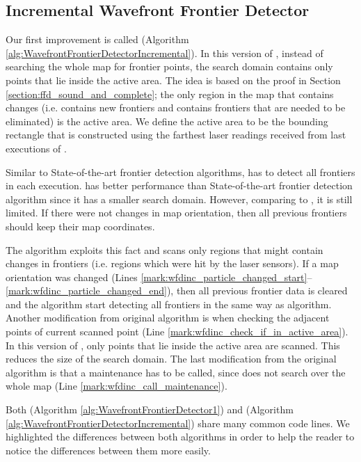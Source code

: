 \subsection{Incremental Wavefront Frontier Detector}
\label{section:wfd_incremental}
Our first \WFD improvement is called \WFDINC (Algorithm
\ref{alg:WavefrontFrontierDetectorIncremental}). In this version of \WFD,
instead of searching the whole map for frontier points, the search domain
contains only points that lie inside the active area. The idea is based on
the proof in Section \ref{section:ffd_sound_and_complete}; the only region in
the map that contains changes (i.e. contains new frontiers and contains
frontiers that are needed to be eliminated) is the active area. We define the
active area to be the bounding rectangle that is constructed using the farthest
laser readings received from last executions of \WFDINC.


 
Similar to State-of-the-art frontier detection algorithms, \WFD
has to detect all frontiers in each execution. \WFD has better performance
than State-of-the-art frontier detection algorithm since it has a smaller search
domain. However, comparing to \FFD, it is still limited. If there were
not changes in map orientation, then all previous frontiers should keep their
map coordinates. 

The \WFDINC algorithm exploits this fact and scans only regions
that might contain changes in frontiers (i.e. regions which were hit by the
laser sensors). If a map orientation was changed (Lines
\ref{mark:wfdinc_particle_changed_start}--\ref{mark:wfdinc_particle_changed_end}),
then all previous frontier data is cleared and the
algorithm start detecting all frontiers in the same way as \WFD algorithm.
Another modification from original \WFD algorithm is when checking the adjacent
points of current scanned point (Line
\ref{mark:wfdinc_check_if_in_active_area}). In this version of \WFD, only points
that lie inside the active area are scanned. This reduces the size of the search
domain. The last modification from the original \WFD algorithm is that a
maintenance has to be called, since \WFDINC does not search over the whole map
(Line \ref{mark:wfdinc_call_maintenance}).     

Both \WFD (Algorithm \ref{alg:WavefrontFrontierDetector1}) and \WFDINC
(Algorithm \ref{alg:WavefrontFrontierDetectorIncremental}) share many common code lines.
We highlighted the differences between both algorithms in order to help the reader
to notice the differences between them more easily.
%



